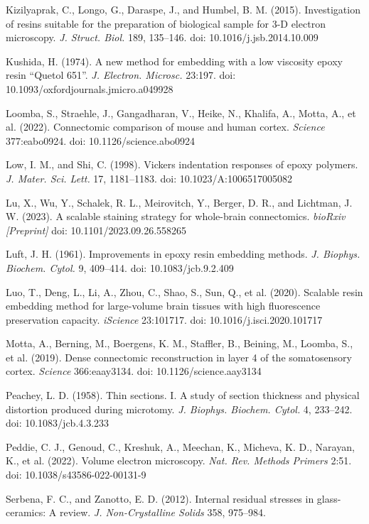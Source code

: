 \documentclass{article}
\newenvironment{reflist}{\par\small\setlength{\parindent}{0pt}\everypar{\hangindent=2.2em\hangafter=1}}{\par}
\begin{document}
\begin{reflist}
Kizilyaprak, C., Longo, G., Daraspe, J., and Humbel, B. M. (2015). Investigation of resins suitable for the preparation of biological sample for 3-D electron microscopy. \emph{J. Struct. Biol.} 189, 135–146. doi: 10.1016/j.jsb.2014.10.009

Kushida, H. (1974). A new method for embedding with a low viscosity epoxy resin “Quetol 651”. \emph{J. Electron. Microsc.} 23:197. doi: 10.1093/oxfordjournals.jmicro.a049928

Loomba, S., Straehle, J., Gangadharan, V., Heike, N., Khalifa, A., Motta, A., et al. (2022). Connectomic comparison of mouse and human cortex. \emph{Science} 377:eabo0924. doi: 10.1126/science.abo0924

Low, I. M., and Shi, C. (1998). Vickers indentation responses of epoxy polymers. \emph{J. Mater. Sci. Lett.} 17, 1181–1183. doi: 10.1023/A:1006517005082

Lu, X., Wu, Y., Schalek, R. L., Meirovitch, Y., Berger, D. R., and Lichtman, J. W. (2023). A scalable staining strategy for whole-brain connectomics. \emph{bioRxiv [Preprint]} doi: 10.1101/2023.09.26.558265

Luft, J. H. (1961). Improvements in epoxy resin embedding methods. \emph{J. Biophys.} \emph{Biochem. Cytol.} 9, 409–414. doi: 10.1083/jcb.9.2.409

Luo, T., Deng, L., Li, A., Zhou, C., Shao, S., Sun, Q., et al. (2020). Scalable resin embedding method for large-volume brain tissues with high fluorescence preservation capacity. \emph{iScience} 23:101717. doi: 10.1016/j.isci.2020.101717

Motta, A., Berning, M., Boergens, K. M., Staffler, B., Beining, M., Loomba, S., et al. (2019). Dense connectomic reconstruction in layer 4 of the somatosensory cortex. \emph{Science} 366:eaay3134. doi: 10.1126/science.aay3134

Peachey, L. D. (1958). Thin sections. I. A study of section thickness and physical distortion produced during microtomy. \emph{J. Biophys. Biochem. Cytol.} 4, 233–242. doi: 10.1083/jcb.4.3.233

Peddie, C. J., Genoud, C., Kreshuk, A., Meechan, K., Micheva, K. D., Narayan, K., et al. (2022). Volume electron microscopy. \emph{Nat. Rev. Methods Primers} 2:51. doi: 10.1038/s43586-022-00131-9

Serbena, F. C., and Zanotto, E. D. (2012). Internal residual stresses in glass-ceramics: A review. \emph{J. Non-Crystalline Solids} 358, 975–984.


\end{reflist}
\end{document}
